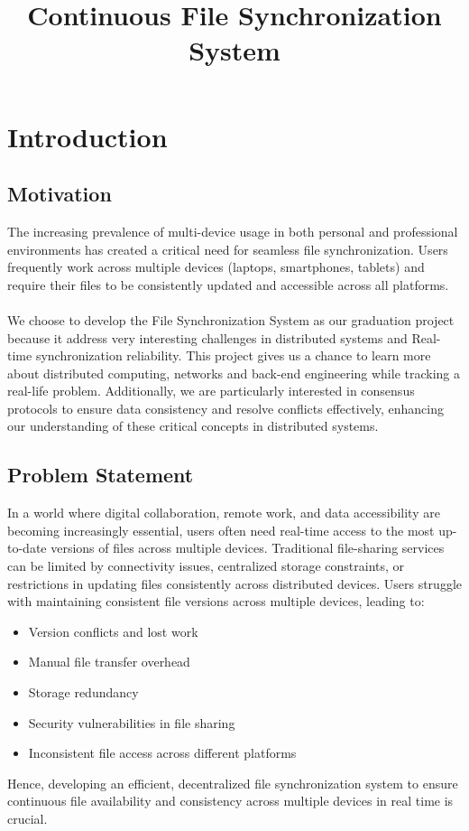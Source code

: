 \documentclass{article}
\title{
\centering Continuous File Synchronization System
}
\begin{document}
\maketitle
\newpage

\section{Introduction}

\subsection{Motivation} {
  The increasing prevalence of multi-device usage in both personal and professional environments has created a critical need for seamless file synchronization. Users frequently work across multiple devices (laptops, smartphones, tablets) and require their files to be consistently updated and accessible across all platforms. \\ \\ We choose to develop the File Synchronization System as our graduation project because it address very interesting challenges in distributed systems and Real-time synchronization reliability. This project gives us a chance to learn more about distributed computing, networks and back-end engineering while tracking a real-life problem. Additionally, we are particularly interested in consensus protocols to ensure data consistency and resolve conflicts effectively, enhancing our understanding of these critical concepts in distributed systems.
}

\subsection{Problem Statement}
      { In a world where digital collaboration, remote work, and data accessibility are becoming increasingly essential, users often need real-time access to the most up-to-date versions of files across multiple devices. Traditional file-sharing services can be limited by connectivity issues, centralized storage constraints, or restrictions in updating files consistently across distributed devices. Users struggle with maintaining consistent file versions across multiple devices, leading to:
      \begin{itemize}
        \item Version conflicts and lost work
        \item Manual file transfer overhead
        \item Storage redundancy
        \item Security vulnerabilities in file sharing
        \item Inconsistent file access across different platforms
      \end{itemize}
Hence, developing an efficient, decentralized file synchronization system to ensure continuous file availability and consistency across multiple devices in real time is crucial.
      }
\end{document}
